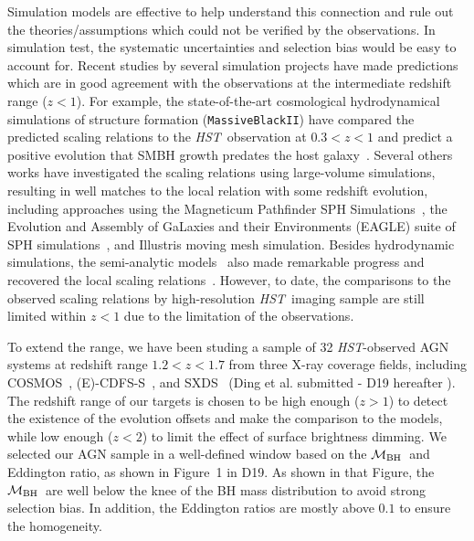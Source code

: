 \documentclass{natureprintstyle}
\newcommand{\hst}{{\it HST}}
\newcommand{\mbh}{$\mathcal M_{\rm BH}$}
\begin{document}
Simulation models are effective to help understand this connection and rule out the theories/assumptions which could not be verified by the observations. In simulation test, the systematic uncertainties and selection bias would be easy to account for. Recent studies by several simulation projects have made predictions which are in good agreement with the observations at the intermediate redshift range ($z<1$). For example, the state-of-the-art cosmological hydrodynamical simulations of structure formation (\texttt{MassiveBlackII}) have compared the predicted scaling relations to the \hst\ observation at $0.3<z<1$ and predict a positive evolution that SMBH growth predates the host galaxy~\cite{DeG++15}. Several others works have investigated the scaling relations using large-volume simulations, resulting in well matches to the local relation with some redshift evolution, including approaches using the Magneticum Pathfinder SPH Simulations~\cite{Steinborn2015}, the Evolution and Assembly of GaLaxies and their Environments (EAGLE) suite of SPH simulations~\cite{Schaye2015}, and Illustris moving mesh simulation\cite{Sijacki2015, Vogelsberger2014, Li2019}. Besides hydrodynamic simulations, the semi-analytic models~\cite{Menci2014, Menci2016} also made remarkable progress and recovered the local scaling relations~\cite{Kormendy13}. However, to date, the comparisons to the observed scaling relations by high-resolution \hst\ imaging sample are still limited within $z<1$ due to the limitation of the observations.

To extend the range, we have been studing a sample of 32 \hst-observed AGN systems at redshift range $1.2<z<1.7$ from three X-ray coverage fields, including COSMOS~\cite{Civano2016}, (E)-CDFS-S~\cite{Lehmer2005, Xue2011}, and SXDS~\cite{Ueda2008} (Ding et al. submitted - D19 hereafter ). The redshift range of our targets is chosen to be high enough ($z>1$) to detect the existence of the evolution offsets and make the comparison to the models, while low enough ($z<2$) to limit the effect of surface brightness dimming. 
We selected our AGN sample in a well-defined window based on the \mbh\ and Eddington ratio, as shown in Figure~1 in D19. As shown in that Figure, the \mbh\ are well below the knee of the BH mass distribution to avoid strong selection bias. In addition, the Eddington ratios are mostly above $0.1$ to ensure the homogeneity.
\end{document}

